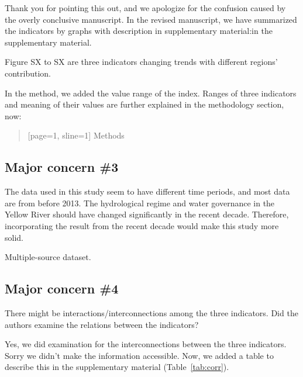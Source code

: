 \AR{} Thank you for pointing this out, and we apologize for the confusion caused by the overly conclusive manuscript. In the revised manuscript, we have summarized the indicators by graphs with description in supplementary material:in the supplementary material.

\AR*{} Figure SX to SX are three indicators changing trends with different regions' contribution.

\AR*{} In the method, we added the value range of the index. Ranges of three indicators and meaning of their values are further explained in the methodology section, now:

\begin{quote}[page=1, sline=1]
	Methods
\end{quote}

\subsection{Major concern \#3}
\RC{} The data used in this study seem to have different time periods, and most data are from before 2013. The hydrological regime and water governance in the Yellow River should have changed significantly in the recent decade. Therefore, incorporating the result from the recent decade would make this study more solid.

\AR{} Multiple-source dataset.

\subsection{Major concern \#4}
\RC{} There might be interactions/interconnections among the three indicators. Did the authors examine the relations between the indicators?

\AR{} Yes, we did examination for the interconnections between the three indicators. Sorry we didn't make the information accessible. Now, we added a table to describe this in the supplementary material (Table~\ref{tab:corr}).



